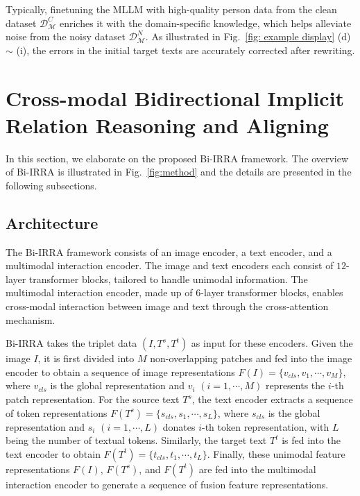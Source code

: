 \documentclass[10pt,journal,compsoc]{IEEEtran}
\begin{document}
Typically, finetuning the MLLM with high-quality person data from the clean dataset \(\mathcal{D}^C_{\mathcal{M}}\) enriches it with the domain-specific knowledge, which helps alleviate noise from the noisy dataset \(\mathcal{D}^N_{\mathcal{M}}\). 
As illustrated in Fig.~\ref{fig: example display} (d) \(\sim\) (i), the errors in the initial target texts are accurately corrected after rewriting. 


\section{Cross-modal Bidirectional Implicit Relation Reasoning and Aligning}

In this section, we elaborate on the proposed Bi-IRRA framework. The overview of Bi-IRRA is illustrated in Fig.~\ref{fig:method} and the details are presented in the following subsections.

\subsection{Architecture} \label{sec:arch}
The Bi-IRRA framework consists of an image encoder, a text encoder, and a multimodal interaction encoder. The image and text encoders each consist of \(12\)-layer transformer blocks, tailored to handle unimodal information. The multimodal interaction encoder, made up of \(6\)-layer transformer blocks, enables cross-modal interaction between image and text through the cross-attention mechanism. 

Bi-IRRA takes the triplet data \((I, T^{s}, T^{t})\) as input for these encoders. Given the image \(I\), it is first divided into \(M\) non-overlapping patches and fed into the image encoder to obtain a sequence of image representations \(F(I) = \{v_{cls}, v_1, \cdots, v_{M} \}\), where \(v_{cls}\) is the global representation and \(v_i\) \((i=1, \cdots, M)\) represents the \(i\)-th patch representation. For the source text \(T^{s}\), the text encoder extracts a sequence of token representations \(F(T^{s}) = \{s_{cls}, s_1, \cdots, s_{L}\}\), where \(s_{cls}\) is the global representation and \(s_i\) \((i=1, \cdots, L)\) donates \(i\)-th token representation, with \(L\) being the number of textual tokens. Similarly, the target text \(T^{t}\) is fed into the text encoder to obtain \(F(T^{t}) = \{t_{cls}, t_1, \cdots, t_{L}\}\). Finally, these unimodal feature representations \(F(I)\), \(F(T^s)\), and \(F(T^t)\) are fed into the multimodal interaction encoder to generate a sequence of fusion feature representations.
\end{document}
